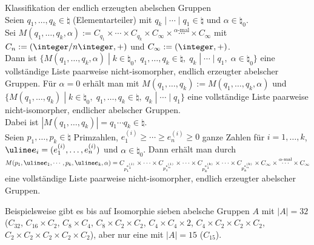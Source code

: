 \begin{Satz}{Klassifikation der endlich erzeugten abelschen Gruppen} \\
    Seien $q_1, \dotsc, q_k \in \natural$ (Elementarteiler) mit
    $q_k \;|\; \dotsb \;|\; q_1 \in \natural$ und $\alpha \in \natural_0$. \\
    Sei $M(q_1, \dotsc, q_k, \alpha) := C_{q_1} \times \dotsb \times C_{q_k}
    \times C_\infty \times \overset{\alpha\text{-mal}}{\dotsb} \times
    C_\infty$
    mit $C_n := (\integer/n\integer, +)$ und $C_\infty := (\integer, +)$. \\
    Dann ist $\{M(q_1, \dotsc, q_k, \alpha) \;|\;
    k \in \natural_0,\;
    q_1, \dotsc, q_k \in \natural,\;
    q_k \;|\; \dotsb \;|\; q_1,\;
    \alpha \in \natural_0\}$
    eine vollständige Liste paarweise nicht-isomorpher, endlich erzeugter
    abelscher Gruppen.
    Für $\alpha = 0$ erhält man mit
    $M(q_1, \dotsc, q_k) := M(q_1, \dotsc, q_k, \alpha)$ und
    $\{M(q_1, \dotsc, q_k) \;|\;
    k \in \natural_0,\;
    q_1, \dotsc, q_k \in \natural,\;
    q_k \;|\; \dotsb \;|\; q_1\}$
    eine vollständige Liste paarweise nicht-isomorpher, endlicher
    abelscher Gruppen. \\
    Dabei ist $|M(q_1, \dotsc, q_k)| = q_1 \dotsb q_k \in \natural$. \\
    Seien $p_1, \dotsc, p_k \in \natural$ Primzahlen,
    $e_1^{(i)} \ge \dotsb \ge e_n^{(i)} \ge 0$ ganze Zahlen für
    $i = 1, \dotsc, k$,
    $\mi{e}_i = (e_1^{(i)}, \dotsc, e_n^{(i)})$ und $\alpha \in \natural_0$.
    Dann erhält man durch \\
    $M(p_1, \mi{e}_1, \dotsb, p_k, \mi{e}_k, \alpha) = C_{p_1^{e_1^{(1)}}}
    \times \dotsb \times C_{p_1^{e_n^{(1)}}} \times \dotsb \times
    C_{p_k^{e_1^{(k)}}} \times \dotsb \times C_{p_k^{e_n^{(k)}}} \times
    C_\infty \times \overset{\alpha\text{-mal}}{\dotsb} \times C_\infty$
    eine vollständige Liste paarweise nicht-isomorpher, endlich erzeugter
    abelscher Gruppen.
\end{Satz}

\begin{Bem}
    Beispielsweise gibt es bis auf Isomorphie sieben abelsche Gruppen $A$
    mit $|A| = 32$ ($C_{32}$, $C_{16} \times C_2$, $C_8 \times C_4$,
    $C_8 \times C_2 \times C_2$, $C_4 \times C_4 \times 2$,
    $C_4 \times C_2 \times C_2 \times C_2$,
    $C_2 \times C_2 \times C_2 \times C_2 \times C_2$), aber nur eine
    mit $|A| = 15$ ($C_{15}$).
\end{Bem}

